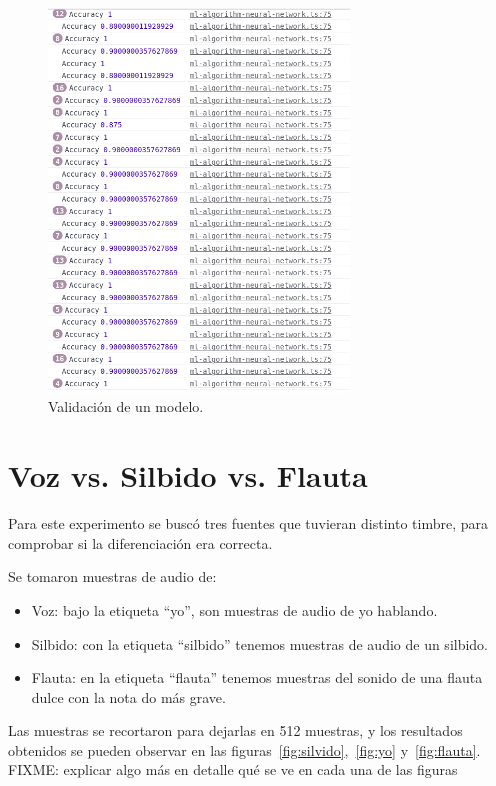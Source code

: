 \documentclass[a4paper, 12pt]{book}
\begin{document}
\begin{figure}
	\centering
	\includegraphics[width=8cm, keepaspectratio]{img/validacion.png}
	\caption{Validación de un modelo.}\label{fig:validacion}
\end{figure}

\section{Voz vs. Silbido vs. Flauta}
\label{sec:yo-silv-flauta}

Para este experimento se buscó tres fuentes que tuvieran distinto timbre, para comprobar si la diferenciación era correcta.

Se tomaron muestras de audio de:
\begin{itemize}
	\item Voz: bajo la etiqueta ``yo'', son muestras de audio de yo hablando.
	\item Silbido: con la etiqueta ``silbido'' tenemos muestras de audio de un silbido.
	\item Flauta: en la etiqueta ``flauta'' tenemos muestras del sonido de una flauta dulce con la nota do más grave.
\end{itemize}

Las muestras se recortaron para dejarlas en 512 muestras, y los resultados obtenidos se pueden observar en las figuras~\ref{fig:silvido},~\ref{fig:yo} y~\ref{fig:flauta}. 
FIXME: explicar algo más en detalle qué se ve en cada una de las figuras
\end{document}
